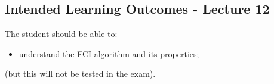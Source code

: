 \subsection*{Intended Learning Outcomes - Lecture 12}

The student should be able to:
\begin{itemize}
\item understand the FCI algorithm and its properties;
\end{itemize}
(but this will not be tested in the exam).
